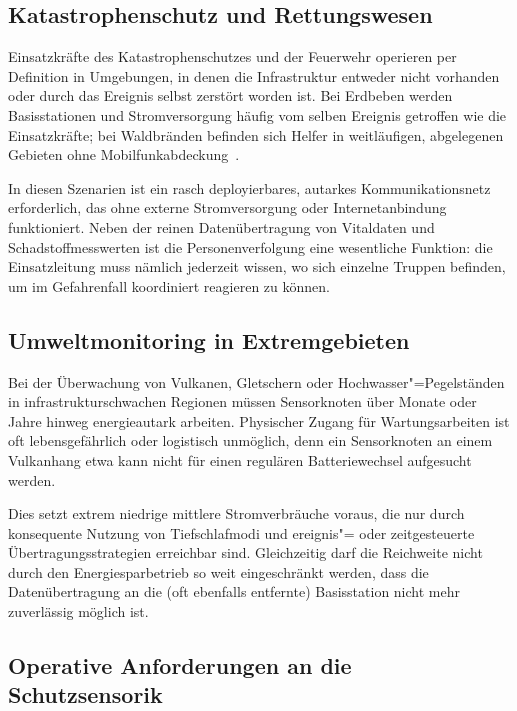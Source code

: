 \subsection{Katastrophenschutz und Rettungswesen}
\label{subsec:uc-katastrophenschutz}

Einsatzkräfte des Katastrophenschutzes und der Feuerwehr operieren per Definition
in Umgebungen, in denen die Infrastruktur entweder nicht vorhanden oder durch
das Ereignis selbst zerstört worden ist. Bei Erdbeben werden Basisstationen und
Stromversorgung häufig vom selben Ereignis getroffen wie die Einsatzkräfte; bei
Waldbränden befinden sich Helfer in weitläufigen, abgelegenen Gebieten ohne
Mobilfunkabdeckung~\cite{sciulloDesignPerformanceEvaluation2020}.

In diesen Szenarien ist ein rasch deployierbares, autarkes Kommunikationsnetz
erforderlich, das ohne externe Stromversorgung oder Internetanbindung funktioniert.
Neben der reinen Datenübertragung von Vitaldaten und Schadstoffmesswerten ist
die Personenverfolgung eine wesentliche Funktion: die Einsatzleitung muss nämlich jederzeit wissen, wo sich einzelne 
Truppen befinden, um im Gefahrenfall koordiniert reagieren zu können. 

\subsection{Umweltmonitoring in Extremgebieten}
\label{subsec:uc-umwelt}

Bei der Überwachung von Vulkanen, Gletschern oder Hochwasser"=Pegelständen
in infrastrukturschwachen Regionen müssen Sensorknoten über Monate oder Jahre
hinweg energieautark arbeiten. Physischer Zugang für Wartungsarbeiten ist oft
lebensgefährlich oder logistisch unmöglich, denn ein Sensorknoten an einem Vulkanhang etwa
kann nicht für einen regulären Batteriewechsel aufgesucht werden.

Dies setzt extrem niedrige mittlere Stromverbräuche voraus, die nur durch
konsequente Nutzung von Tiefschlafmodi und ereignis"= oder zeitgesteuerte
Übertragungsstrategien erreichbar sind. Gleichzeitig darf die Reichweite nicht
durch den Energiesparbetrieb so weit eingeschränkt werden, dass die Datenübertragung
an die (oft ebenfalls entfernte) Basisstation nicht mehr zuverlässig möglich ist.

\subsection{Operative Anforderungen an die Schutzsensorik}
\label{subsec:anforderungen-zusammenfassung}

